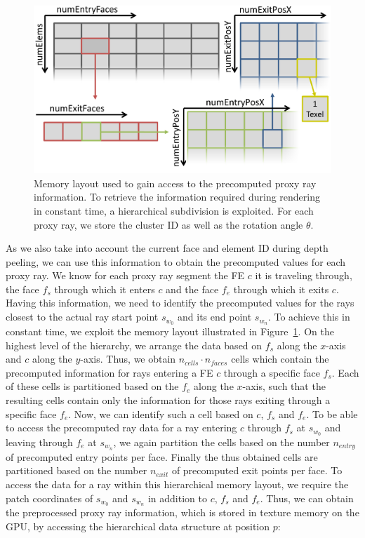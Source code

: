 \documentclass[review,journal]{vgtc}         %
\begin{document}
\begin{figure}[t]
    \centering
    \includegraphics[width=\linewidth]{figures/curvetexmap-memorylayout}
    \caption{Memory layout used to gain access to the precomputed proxy ray information. To retrieve the information required during rendering in constant time, a hierarchical subdivision is exploited. For each proxy ray, we store the cluster ID as well as the rotation angle $\theta$.}
    \label{fig:memorylayout}
\end{figure}


As we also take into account the current face and element ID during depth peeling, we can use this information to obtain the precomputed values for each proxy ray. We know for each proxy ray segment the FE $c$ it is traveling through, the face $f_s$ through which it enters $c$ and the face $f_e$ through which it exits $c$. Having this information, we need to identify the precomputed values for the rays closest to the actual ray start point $s_{w_0}$ and its end point $s_{w_n}$. To achieve this in constant time, we exploit the memory layout illustrated in Figure~\ref{fig:memorylayout}. On the highest level of the hierarchy, we arrange the data based on $f_s$ along the $x$-axis and $c$ along the $y$-axis. Thus, we obtain $n_{cells} \cdot n_{faces}$ cells which contain the precomputed information for rays entering a FE $c$ through a specific face $f_s$. Each of these cells is partitioned based on the $f_e$ along the $x$-axis, such that the resulting cells contain only the information for those rays exiting through a specific face $f_e$. Now, we can identify such a cell based on $c$, $f_s$ and $f_e$. To be able to access the precomputed ray data for a ray entering $c$ through $f_s$ at $s_{w_0}$ and leaving through $f_e$ at $s_{w_n}$, we again partition the cells based on the number $n_{entry}$ of precomputed entry points per face. Finally the thus obtained cells are partitioned based on the number $n_{exit}$ of precomputed exit points per face. To access the data for a ray within this hierarchical memory layout, we require the patch coordinates of $s_{w_0}$ and $s_{w_n}$ in addition to $c$, $f_s$ and $f_e$. Thus, we can obtain the preprocessed proxy ray information, which is stored in texture memory on the GPU, by accessing the hierarchical data structure at position $p$:
\end{document}
